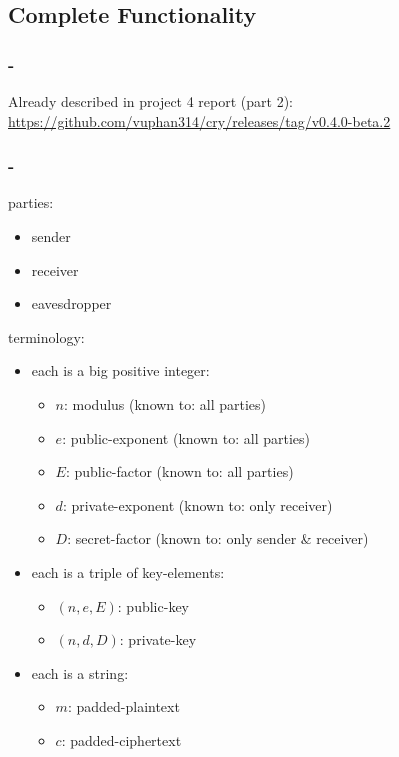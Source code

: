 \subsection{Complete Functionality}


\subsubsection{\rsa-\cs}

Already described in project 4 report (part 2):
\url{https://github.com/vuphan314/cry/releases/tag/v0.4.0-beta.2}


\subsubsection{\dummy-\cs}

parties:
\begin{itemize}
\item sender
\item receiver
\item eavesdropper
\end{itemize}

terminology:
\begin{itemize}
\item each  is a big positive integer:
  \begin{itemize}
  \item $n$: modulus (known to: all parties)
  \item $e$: public-exponent (known to: all parties)
  \item $E$: public-factor (known to: all parties)
  \item $d$: private-exponent (known to: only receiver)
  \item $D$: secret-factor
    (known to: only sender \& receiver)
  \end{itemize}
\item each  is a triple of key-elements:
  \begin{itemize}
  \item $(n, e, E)$: public-key
  \item $(n, d, D)$: private-key
  \end{itemize}
\item each  is a string:
  \begin{itemize}
  \item $m$: padded-plaintext
  \item $c$: padded-ciphertext
  \end{itemize}
\end{itemize}

